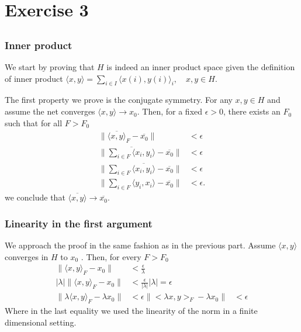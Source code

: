 \documentclass[a4paper,12pt]{article} %
\begin{document}
\section{Exercise 3}
\subsection{}
\subsubsection{Inner product}
We start by proving that \(H\) is indeed an inner product space given the definition of inner product \(\langle x, y \rangle = \sum_{i \in I} \langle x(i), y(i) \rangle_i, \quad x, y \in H.
\)

The first property we prove is the conjugate symmetry.
For any \(x,y \in H\) and assume the net converges \(\langle x,y \rangle  \to  x_0\). Then, for a fixed \(\epsilon >0\), there exists an \(F_0\) such that for all \(F>F_0\)
\begin{align*}
    \| \overline{\langle x,y \rangle }_F - \overline{x_0}    \|                 & <\epsilon  \\
    \| \overline{\sum_{i \in  F}\langle x_i,y_i \rangle } - \overline{x_0}   \| & < \epsilon \\
    \| \sum_{i \in  F}\overline{\langle x_i,y_i \rangle }  -\overline{x_0}  \|  & < \epsilon \\
    \| \sum_{i \in  F}\langle y_i, x_i \rangle -\overline{ x_0}  \|             & <\epsilon.
\end{align*}
we conclude that \(\overline{\langle x,y \rangle } \to \overline{x_0}  \).

\subsubsection{Linearity in the first argument}
We approach the proof in the same fashion as in the previous part. Assume \(\langle x,y \rangle \) converges in \(H\) to \(x_0\) .
Then, for every \(F>F_0\)
\begin{align*}
    \| \langle x,y \rangle_F -x_0 \|                   & < \frac{\epsilon }{\lambda }                        \\
    |\lambda |\| \langle x,y \rangle_F -x_0 \|         & < \frac{\epsilon}{|\lambda |} |\lambda | = \epsilon \\
    \| \lambda \langle x,y \rangle_F - \lambda x_0  \| & < \epsilon
    \| <\lambda x, y> _F - \lambda x_0 \|              & < \epsilon
\end{align*}
Where in the last equality we used the linearity of the norm in a finite dimensional setting.
\end{document}
